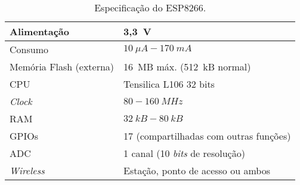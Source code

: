 \begin{table}[H]
    \centering
    \caption[Especificação do ESP8266]{Especificação do ESP8266.
    \label{tab:espec-microcontrolador}}
    \begin{tabular}{|l|l|}
    \hline
    Alimentação & 3,3\ V \\ \hline
    Consumo & $10\ \mu A - 170\ mA$ \\ \hline
    Memória Flash (externa) & 16\ MB máx. (512\ kB normal) \\ \hline
    CPU & Tensilica L106 32 bits \\ \hline
    \emph{Clock} & $80 - 160\ MHz$ \\ \hline
    RAM & $32\ kB - 80\ kB$ \\ \hline
    GPIOs & 17 (compartilhadas com outras funções) \\ \hline
    ADC & 1 canal (10 \emph{bits} de resolução) \\ \hline
    \emph{Wireless} & Estação, ponto de acesso ou ambos \\ \hline
    \end{tabular}
\end{table}
